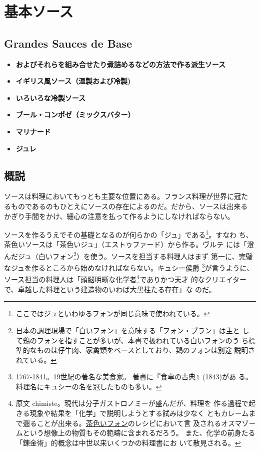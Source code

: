 \newpage

\hypertarget{ux57faux672cux30bdux30fcux30b9}{%
\section{基本ソース}\label{ux57faux672cux30bdux30fcux30b9}}

\hypertarget{grandes-sauces-de-base}{%
\subsection{Grandes Sauces de Base}\label{grandes-sauces-de-base}}


\begin{itemize}
\item
  \textbf{およびそれらを組み合せたり煮詰めるなどの方法で作る派生ソース}
\item
  \textbf{イギリス風ソース（温製および冷製)}
\item
  \textbf{いろいろな冷製ソース}
\item
  \textbf{ブール・コンポゼ（ミックスバター）}
\item
  \textbf{マリナード}
\item
  \textbf{ジュレ}
\end{itemize}

\hypertarget{ux6982ux8aac}{%
\subsection{概説}\label{ux6982ux8aac}}

ソースは料理においてもっとも主要な位置にある。フランス料理が世界に冠た
るものであるのもひとえにソースの存在によるのだ。だから、ソースは出来る
かぎり手間をかけ、細心の注意を払って作るようにしなければならない。

ソースを作るうえでその基礎となるのが何らかの「ジュ」である\footnote{ここではジュといわゆるフォンが同じ意味で使われている。}。すなわ
ち、茶色いソースは「茶色いジュ」（エストゥファード）から作る。ヴルテ
には「澄んだジュ（白いフォン\footnote{日本の調理現場で「白いフォン」を意味する「フォン・ブラン」は主と
  して鶏のフォンを指すことが多いが、本書で扱われている白いフォンのう
  ち標準的なものは仔牛肉、家禽類をベースとしており、鶏のフォンは別途
  説明されている。}）を使う。ソースを担当する料理人はまず
第一に、完璧なジュを作るところから始めなければならない。キュシー侯爵
\footnote{1767-1841。19世紀の著名な美食家。
  著書に『食卓の古典』(1843)があ
  る。料理名にキュシーの名を冠したものも多い。}が言うように、ソース担当の料理人は「頭脳明晰な化学者\footnote{原文
  chimiste。現代は分子ガストロノミーが盛んだが、料理を
  作る過程で起きる現象や結果を「化学」で説明しようとする試みは少なく
  ともカレームまで遡ることが出来る。\protect\hyperlink{fonds-brun}{茶色いフォン}のレシピにおいて言
  及されるオスマゾームという想像上の物質もその範疇に含まれるだろう。
  また、化学の前身たる「錬金術」的概念は中世以来いくつかの料理書にお
  いて散見される。}でありかつ天才
的なクリエイターで、卓越した料理という建造物のいわば大黒柱たる存在」な
のだ。

